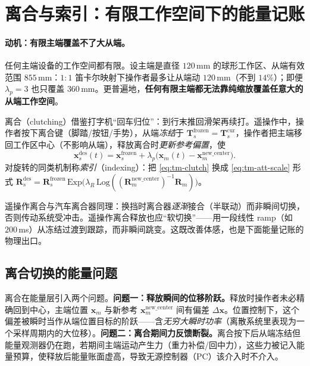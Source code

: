\section{离合与索引：有限工作空间下的能量记账}
\label{sec:tm-clutch}

\paragraph{动机：有限主端覆盖不了大从端。}
任何主端设备的工作空间都有限。设主端是直径 $120\,$mm 的球形工作区、从端有效范围 $855\,$mm：$1{:}1$ 笛卡尔映射下操作者最多让从端动 $120\,$mm（不到 $14\%$）；即便 $\lambda_p=3$ 也只覆盖 $360\,$mm。更普遍地，\textbf{任何有限主端都无法靠纯缩放覆盖任意大的从端工作空间}。

\begin{definition}[离合机制]\label{def:tm-clutch}
离合（clutching）借鉴打字机“回车归位”：到行末推回滑架再续打。遥操作中，操作者按下离合键（脚踏/按钮/手势），从端\emph{冻结}于 $\mathbf{T}_s^{\text{frozen}}=\mathbf{T}_s^{\text{cur}}$，操作者把主端移回工作区中心（不影响从端），释放离合时\emph{更新参考偏置}，使
\begin{equation}
  \mathbf{x}_s^{\text{des}}(t)=\mathbf{x}_s^{\text{frozen}}+\lambda_p\big(\mathbf{x}_m(t)-\mathbf{x}_m^{\text{new\_center}}\big).
  \label{eq:tm-clutch}
\end{equation}
对旋转的同类机制称\emph{索引}（indexing）：把 \cref{eq:tm-clutch} 换成 \cref{eq:tm-att-scale} 形式 $\mathbf{R}_s^{\text{des}}=\mathbf{R}_s^{\text{frozen}}\,\mathrm{Exp}\!\big(\lambda_R\,\mathrm{Log}((\mathbf{R}_m^{\text{new\_center}})^{-1}\mathbf{R}_m)\big)$。
\end{definition}

\begin{insight}\label{ins:tm-softswitch}
遥操作离合与汽车离合器同理：换挡时离合器\emph{逐渐}接合（半联动）而非瞬间切换，否则传动系统受冲击。遥操作离合释放也应“软切换”——用一段线性 ramp（如 $200\,$ms）从冻结过渡到跟踪，而非瞬间跳变。这既改善体感，也是下面能量记账的物理出口。
\end{insight}

\subsection{离合切换的能量问题}
\label{sec:tm-clutch-energy}
离合在能量层引入两个问题。\textbf{问题一：释放瞬间的位移阶跃。}释放时操作者未必精确回到中心，主端位置 $\mathbf{x}_m$ 与新参考 $\mathbf{x}_m^{\text{new\_center}}$ 间有偏差 $\Delta\mathbf{x}$。位置控制下，这个偏差被瞬时当作从端位置目标的阶跃——含\emph{无穷大瞬时功率}（离散系统里表现为一个采样周期内的大位移）。\textbf{问题二：离合期间力反馈断裂。}离合按下后从端冻结但能量观测器仍在跑，若期间主端运动产生力（重力补偿/回中力），这些力被记入能量预算，使释放后能量账面虚高，导致无源控制器（PC）该介入时不介入。

